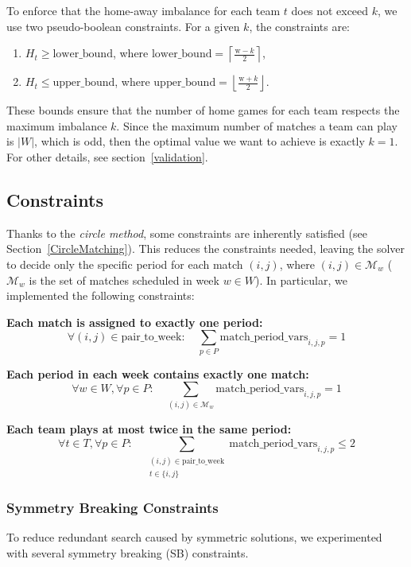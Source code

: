 To enforce that the home-away imbalance for each team $t$ does not exceed $k$, we use two pseudo-boolean constraints. For a given $k$, the constraints are:
\begin{enumerate}
    \item $H_t \ge \text{lower\_bound}$, where $\text{lower\_bound} = \left\lceil \frac{\text{w} - k}{2} \right\rceil$,
    \item $H_t \le \text{upper\_bound}$, where $\text{upper\_bound} = \left\lfloor \frac{\text{w} + k}{2} \right\rfloor$.
\end{enumerate}
These bounds ensure that the number of home games for each team respects the maximum imbalance $k$. Since the maximum number of matches a team can play is $|W|$, which is odd, then the optimal value we want to achieve is exactly $k=1$. For other details, see section~\ref{validation}.


\subsection{Constraints}
Thanks to the \emph{circle method}, some constraints are inherently satisfied (see Section~\ref{CircleMatching}).
This reduces the constraints needed, leaving the solver to decide only the specific period for each match $(i,j)$,  where $(i,j) \in \mathcal{M}_w$ ($\mathcal{M}_w$ is the set of matches scheduled in week $w \in W$). In particular, we implemented the following constraints:

\textbf{Each match is assigned to exactly one period:}
\[
\forall (i,j) \in \text{pair\_to\_week}: \quad \sum_{p \in P} \text{match\_period\_vars}_{i,j,p} = 1
\]

\textbf{Each period in each week contains exactly one match:}
\[
\forall w \in W, \forall p \in P: \quad \sum_{(i,j) \in \mathcal{M}_w} \text{match\_period\_vars}_{i,j,p} = 1
\]

\textbf{Each team plays at most twice in the same period:}
\[
\forall t \in T, \forall p \in P: \quad \sum_{\substack{(i,j) \in \text{pair\_to\_week} \\ t \in \{i,j\}}} \text{match\_period\_vars}_{i,j,p} \leq 2
\]

\subsubsection*{Symmetry Breaking Constraints}
To reduce redundant search caused by symmetric solutions, we experimented with several symmetry breaking (SB) constraints.

